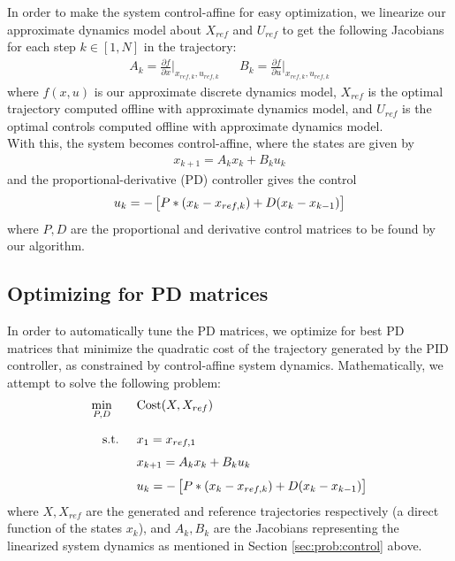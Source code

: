 \documentclass[11pt]{article}
\begin{document}
    In order to make the system control-affine for easy optimization, we linearize our approximate dynamics model about $X_{ref}$ and $U_{ref}$ to get the following Jacobians for each step $k \in [1, N] $ in the trajectory:
    \begin{align*}
        A_k = \frac{\partial f}{\partial x}\bigg|_{x_{ref,k},u_{ref,k}} && 
        B_k = \frac{\partial f}{\partial u}\bigg|_{x_{ref,k},u_{ref,k}}
    \end{align*}
    where $f(x,u)$ is our approximate discrete dynamics model, $X_{ref}$ is the optimal trajectory computed offline with approximate dynamics model, and $U_{ref}$ is the optimal controls computed offline with approximate dynamics model. \\
    With this, the system becomes control-affine, where the states are given by
    \begin{align*}
        x_{k+1} = A_k x_k + B_k u_k
    \end{align*}
    and the proportional-derivative (PD) controller gives the control
    \begin{align*}
        u_k = - \left[\strut P * \left(x_{k} - x_{ref,k}\right) + D (x_k - x_{k-1}) \strut \right]
    \end{align*}
    where $P,D$ are the proportional and derivative control matrices to be found by our algorithm.
    
    \pagebreak
    
    \subsection{Optimizing for PD matrices} \label{sec:prob:pdoptim}
    In order to automatically tune the PD matrices, we optimize for best PD matrices that minimize the quadratic cost of the trajectory generated by the PID controller, as constrained by control-affine system dynamics. Mathematically, we attempt to solve the following problem:
    \begin{align*}
        \min_{P,D}\qquad & \mathrm{Cost}(X, X_{ref}) \fracln
        \st \quad & x_1 = x_{ref, 1} \vecln
        &         x_{k+1} = A_k x_k + B_k u_k \vecln
        &         u_k = - \left[\strut P * \left(x_{k} - x_{ref,k}\right) + D (x_k - x_{k-1}) \strut \right]
    \end{align*}
    where $X, X_{ref}$ are the generated and reference trajectories respectively (a direct function of the states $x_k$), and $A_k, B_k$ are the Jacobians representing the linearized system dynamics as mentioned in Section \ref{sec:prob:control} above.
    
\end{document}
